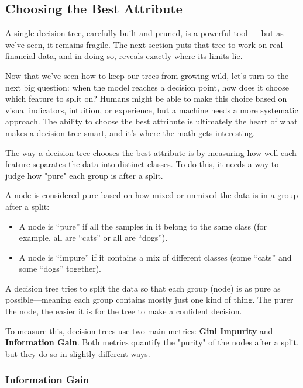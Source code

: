 \subsection{Choosing the Best Attribute}

A single decision tree, carefully built and pruned, is a powerful tool --- but as we've seen, it remains fragile. The next section puts that tree to work on real financial data, and in doing so, reveals exactly where its limits lie.

Now that we've seen how to keep our trees from growing wild, let's turn to the next big question: when the model reaches a decision point, how does it choose which feature to split on? 
Humans might be able to make this choice based on visual indicators, intuition, or experience, but a machine needs a more systematic approach.
The ability to choose the best attribute is ultimately the heart of what makes a decision tree smart, and it's where the math gets interesting.


The way a decision tree chooses the best attribute is by measuring how well each feature separates the data into distinct classes. To do this, it needs a way to judge how "pure" each group is after a split.

A node is considered pure based on how mixed or unmixed the data is in a group after a split:
\begin{itemize}
  \item A node is ``pure'' if all the samples in it belong to the same class (for example, all are ``cats'' or all are ``dogs'').
  \item A node is ``impure'' if it contains a mix of different classes (some ``cats'' and some ``dogs'' together).
\end{itemize}

A decision tree tries to split the data so that each group (node) is as pure as possible---meaning each group contains mostly just one kind of thing. The purer the node, the easier it is for the tree to make a confident decision.

To measure this, decision trees use two main metrics: \textbf{Gini Impurity} and \textbf{Information Gain}. Both metrics quantify the "purity" of the nodes after a split, but they do so in slightly different ways.

\subsubsection{Information Gain}

